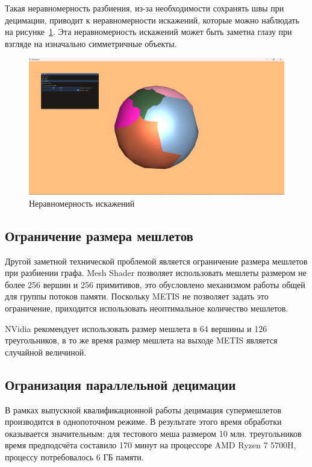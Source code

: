 Такая неравномерность разбиения, из-за необходимости сохранять швы при децимации, приводит к неравномерности искажений, которые можно наблюдать на рисунке~\ref{fig:sphere-1}.
Эта неравномерность искажений может быть заметна глазу при взгляде на изначально симметричные объекты.
\begin{figure}[H]
    \centering
    \includegraphics[width=\textwidth]{sphere1.png}
    \caption{Неравномерность искажений}
    \label{fig:sphere-1}
\end{figure}

\subsection*{Ограничение размера мешлетов}
Другой заметной технической проблемой является ограничение размера мешлетов при разбиении графа.
Mesh Shader позволяет использовать мешлеты размером не более 256 вершин и 256 примитивов, это обусловлено механизмом работы общей для группы потоков памяти.
Поскольку METIS не позволяет задать это ограничение, приходится использовать неоптимальное количество мешлетов.

NVidia рекомендует использовать размер мешлета в 64 вершины и 126 треугольников, в то же время размер мешлета на выходе METIS является случайной величиной.

\subsection*{Огранизация параллельной децимации}
В рамках выпускной квалификационной работы децимация супермешлетов производится в однопоточном режиме.
В результате этого время обработки оказывается значительным: для тестового меша размером 10 млн. треугольников время предподсчёта составило 170 минут на процессоре AMD Ryzen 7 5700H, процессу потребовалось 6 ГБ памяти.
